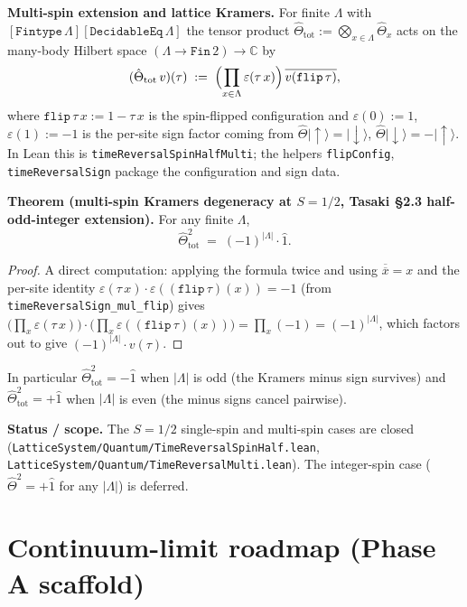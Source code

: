 \documentclass[a4paper,11pt]{article}
\begin{document}
\noindent\textbf{Multi-spin extension and lattice Kramers.}
For finite \(\Lambda\) with \([\texttt{Fintype}\,\Lambda]
[\texttt{DecidableEq}\,\Lambda]\) the tensor product
\(\hat{\Theta}_{\text{tot}} :=
\bigotimes_{x \in \Lambda} \hat{\Theta}_x\) acts on the many-body
Hilbert space \((\Lambda \to \texttt{Fin}\,2) \to \mathbb{C}\) by
\[
  (\hat{\Theta}_{\text{tot}}\,v)(\tau)
  \;:=\;
  \Bigl(\prod_{x \in \Lambda} \varepsilon(\tau\,x)\Bigr)\,
  \overline{v(\texttt{flip}\,\tau)},
\]
where \(\texttt{flip}\,\tau\,x := 1 - \tau\,x\) is the spin-flipped
configuration and \(\varepsilon(0) := 1\),
\(\varepsilon(1) := -1\) is the per-site sign factor coming from
\(\hat{\Theta}|\!\uparrow\rangle = |\!\downarrow\rangle\),
\(\hat{\Theta}|\!\downarrow\rangle = -|\!\uparrow\rangle\). In Lean
this is \texttt{timeReversalSpinHalfMulti}; the helpers
\texttt{flipConfig}, \texttt{timeReversalSign} package the
configuration and sign data.

\noindent\textbf{Theorem (multi-spin Kramers degeneracy at
\(S = 1/2\), Tasaki §2.3 half-odd-integer extension).}
For any finite \(\Lambda\),
\[
  \hat{\Theta}_{\text{tot}}^{2} \;=\; (-1)^{|\Lambda|} \cdot \hat{1}.
\]
\begin{proof}
A direct computation: applying the formula twice and using
\(\overline{\overline{x}} = x\) and the per-site identity
\(\varepsilon(\tau\,x) \cdot \varepsilon((\texttt{flip}\,\tau)(x))
   = -1\) (from \texttt{timeReversalSign\_mul\_flip}) gives
\(\bigl(\prod_x \varepsilon(\tau\,x)\bigr)
  \cdot \bigl(\prod_x \varepsilon((\texttt{flip}\,\tau)(x))\bigr)
  = \prod_x (-1) = (-1)^{|\Lambda|}\),
which factors out to give \((-1)^{|\Lambda|} \cdot v(\tau)\).
\end{proof}

In particular \(\hat{\Theta}_{\text{tot}}^{2} = -\hat{1}\) when
\(|\Lambda|\) is odd (the Kramers minus sign survives) and
\(\hat{\Theta}_{\text{tot}}^{2} = +\hat{1}\) when \(|\Lambda|\)
is even (the minus signs cancel pairwise).

\noindent\textbf{Status / scope.} The \(S = 1/2\) single-spin and
multi-spin cases are closed
(\texttt{LatticeSystem/Quantum/TimeReversalSpinHalf.lean},
\texttt{LatticeSystem/Quantum/TimeReversalMulti.lean}). The
integer-spin case (\(\hat{\Theta}^{2} = +\hat{1}\) for any
\(|\Lambda|\)) is deferred.

\section{Continuum-limit roadmap (Phase A scaffold)}
\label{sec:continuum-limit-roadmap}
\end{document}
